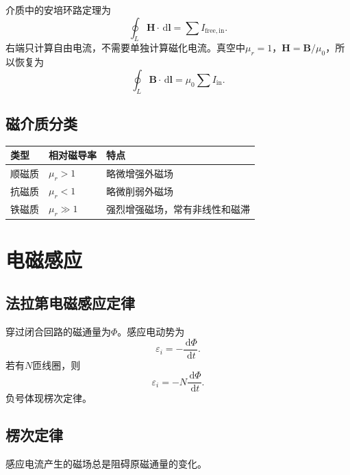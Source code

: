 \documentclass[UTF8,zihao=-4]{ctexart}
\newcommand{\dd}{\,\mathrm d}
\newcommand{\eps}{\varepsilon}
\newcommand{\muz}{\mu_0}
\newcommand{\mur}{\mu_r}
\newcommand{\ve}[1]{\bm{#1}}
\newcommand{\B}{\ve B}
\newcommand{\Hf}{\ve H}
\newcommand{\dl}{\dd\ve l}
\begin{document}
介质中的安培环路定理为
\begin{equation}
\boxed{\oint_L\Hf\cdot\dl=\sum I_{\mathrm{free,in}}}.
\end{equation}
右端只计算自由电流，不需要单独计算磁化电流。真空中\(\mur=1\)，\(\Hf=\B/\muz\)，所以恢复为
\begin{equation}
\oint_L\B\cdot\dl=\muz\sum I_{\mathrm{in}}.
\end{equation}

\subsection{磁介质分类}

\begin{center}
\begin{tabular}{lll}
\toprule
\textbf{类型} & \textbf{相对磁导率} & \textbf{特点} \\
\midrule
顺磁质 & \(\mur>1\) & 略微增强外磁场 \\
抗磁质 & \(\mur<1\) & 略微削弱外磁场 \\
铁磁质 & \(\mur\gg 1\) & 强烈增强磁场，常有非线性和磁滞 \\
\bottomrule
\end{tabular}
\end{center}

\section{电磁感应}

\subsection{法拉第电磁感应定律}

穿过闭合回路的磁通量为\(\Phi\)。感应电动势为
\begin{equation}
\boxed{\eps_i=-\frac{\dd\Phi}{\dd t}}.
\end{equation}
若有\(N\)匝线圈，则
\begin{equation}
\eps_i=-N\frac{\dd\Phi}{\dd t}.
\end{equation}
负号体现楞次定律。

\subsection{楞次定律}

\begin{keybox}[楞次定律]
感应电流产生的磁场总是阻碍原磁通量的变化。
\end{keybox}
\end{document}
